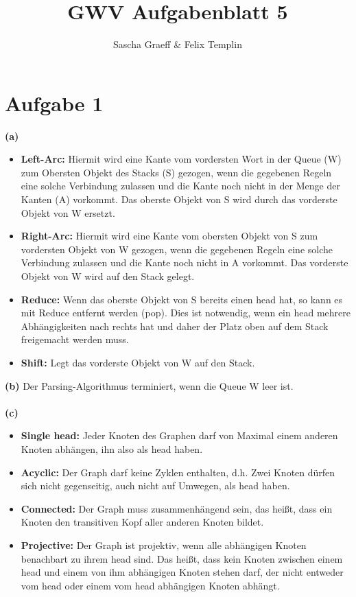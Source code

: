 \documentclass[a4paper,10pt]{article}
\title{GWV Aufgabenblatt 5}
\author{Sascha Graeff \& Felix Templin}
\begin{document}
\maketitle

\section*{Aufgabe 1}
\textbf{(a)}
\begin{itemize}
 \item \textbf{Left-Arc:} Hiermit wird eine Kante vom vordersten Wort in der Queue (W) zum Obersten Objekt des Stacks (S) gezogen, wenn die gegebenen Regeln eine solche Verbindung 
 zulassen und die Kante noch nicht in der Menge der Kanten (A) vorkommt. Das oberste Objekt von S wird durch das vorderste Objekt von W ersetzt.
 \item \textbf{Right-Arc:} Hiermit wird eine Kante vom obersten Objekt von S zum vordersten Objekt von W gezogen, wenn die gegebenen Regeln eine solche Verbindung 
 zulassen und die Kante noch nicht in A vorkommt. Das vorderste Objekt von W wird auf den Stack gelegt.
 \item \textbf{Reduce:} Wenn das oberste Objekt von S bereits einen head hat, so kann es mit Reduce entfernt werden (pop). Dies ist notwendig, wenn ein head mehrere Abhängigkeiten
 nach rechts hat und daher der Platz oben auf dem Stack freigemacht werden muss.
 \item \textbf{Shift:} Legt das vorderste Objekt von W auf den Stack. 
\end{itemize}
\textbf{(b)}
Der Parsing-Algorithmus terminiert, wenn die Queue W leer ist.\\ \\
\textbf{(c)}
\begin{itemize}
 \item \textbf{Single head:} Jeder Knoten des Graphen darf von Maximal einem anderen Knoten abhängen, ihn also als head haben.
 \item \textbf{Acyclic:} Der Graph darf keine Zyklen enthalten, d.h. Zwei Knoten dürfen sich nicht gegenseitig, auch nicht auf Umwegen, als head haben. 
 \item \textbf{Connected:} Der Graph muss zusammenhängend sein, das heißt, dass ein Knoten den transitiven Kopf aller anderen Knoten bildet.
 \item \textbf{Projective:} Der Graph ist projektiv, wenn alle abhängigen Knoten benachbart zu ihrem head sind. Das heißt, dass kein Knoten zwischen einem head und einem von ihm 
 abhängigen Knoten stehen darf, der nicht entweder vom head oder einem vom head abhängigen Knoten abhängt. 
\end{itemize}
\end{document}
